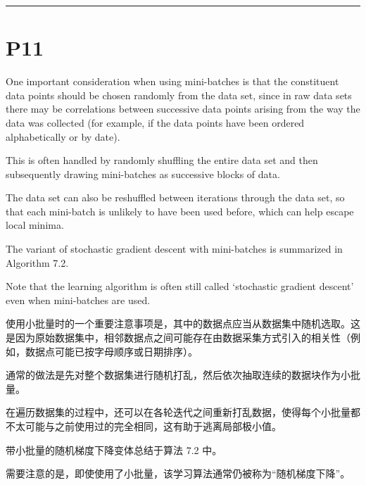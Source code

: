 \documentclass{article}
\begin{document}
\noindent\rule{\linewidth}{0.4pt}

\section{P11}

One important consideration when using mini-batches is that the constituent data points should be chosen randomly from the data set, since in raw data sets there may be correlations between successive data points arising from the way the data was collected (for example, if the data points have been ordered alphabetically or by date). 

This is often handled by randomly shuffling the entire data set and then subsequently drawing mini-batches as successive blocks of data. 

The data set can also be reshuffled between iterations through the data set, so that each mini-batch is unlikely to have been used before, which can help escape local minima. 

The variant of stochastic gradient descent with mini-batches is summarized in Algorithm 7.2. 

Note that the learning algorithm is often still called `stochastic gradient descent' even when mini-batches are used.

{\color{red}
使用小批量时的一个重要注意事项是，其中的数据点应当从数据集中随机选取。这是因为原始数据集中，相邻数据点之间可能存在由数据采集方式引入的相关性（例如，数据点可能已按字母顺序或日期排序）。

通常的做法是先对整个数据集进行随机打乱，然后依次抽取连续的数据块作为小批量。

在遍历数据集的过程中，还可以在各轮迭代之间重新打乱数据，使得每个小批量都不太可能与之前使用过的完全相同，这有助于逃离局部极小值。

带小批量的随机梯度下降变体总结于算法 7.2 中。

需要注意的是，即使使用了小批量，该学习算法通常仍被称为“随机梯度下降”。
}
\end{document}
